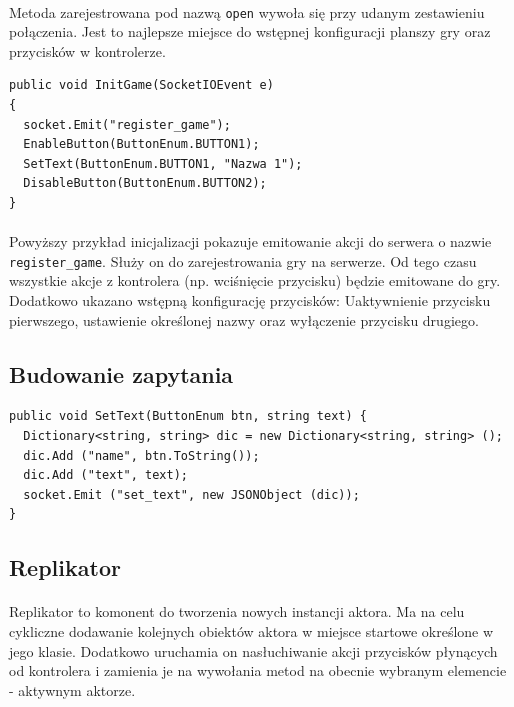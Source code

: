 \paragraph{}
Metoda zarejestrowana pod nazwą \texttt{open} wywoła się przy udanym zestawieniu połączenia. Jest to najlepsze miejsce do wstępnej konfiguracji planszy gry oraz przycisków w kontrolerze.

\begin{lstlisting}[language=CSharp]
public void InitGame(SocketIOEvent e)
{
  socket.Emit("register_game");
  EnableButton(ButtonEnum.BUTTON1);
  SetText(ButtonEnum.BUTTON1, "Nazwa 1");
  DisableButton(ButtonEnum.BUTTON2);
}
\end{lstlisting}

\paragraph{}
Powyższy przykład inicjalizacji pokazuje emitowanie akcji do serwera o nazwie \texttt{register\_game}. Służy on do zarejestrowania gry na serwerze. Od tego czasu wszystkie akcje z kontrolera (np. wciśnięcie przycisku) będzie emitowane do gry.
Dodatkowo ukazano wstępną konfigurację przycisków: Uaktywnienie przycisku pierwszego, ustawienie określonej nazwy oraz wyłączenie przycisku drugiego.

\subsection{Budowanie zapytania}

\begin{lstlisting}[language=CSharp]
public void SetText(ButtonEnum btn, string text) {
  Dictionary<string, string> dic = new Dictionary<string, string> ();
  dic.Add ("name", btn.ToString());
  dic.Add ("text", text);
  socket.Emit ("set_text", new JSONObject (dic));
}
\end{lstlisting}

\subsection{Replikator}
\paragraph{}
Replikator to komonent do tworzenia nowych instancji aktora. Ma na celu cykliczne dodawanie kolejnych obiektów aktora w miejsce startowe określone w jego klasie. Dodatkowo uruchamia on nasłuchiwanie akcji przycisków płynących od kontrolera i zamienia je na wywołania metod na obecnie wybranym elemencie - aktywnym aktorze.

